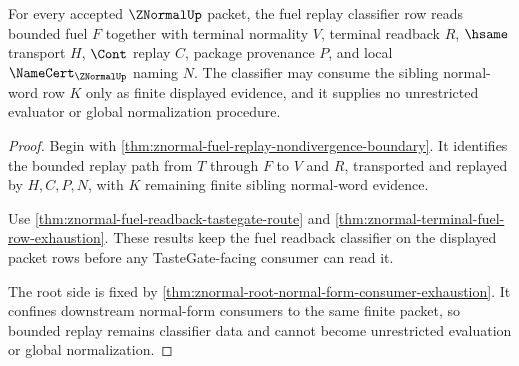 \begin{theorem}
\label{thm:znormal-fuel-replay-classifier-row}
For every accepted $\ZNormalUp$ packet, the fuel replay classifier row reads bounded fuel $F$ together with terminal normality $V$, terminal readback $R$, $\hsame$ transport $H$, $\Cont$ replay $C$, package provenance $P$, and local $\NameCert_{\ZNormalUp}$ naming $N$. The classifier may consume the sibling normal-word row $K$ only as finite displayed evidence, and it supplies no unrestricted evaluator or global normalization procedure.
\end{theorem}
\begin{proof}
Begin with \autoref{thm:znormal-fuel-replay-nondivergence-boundary}. It identifies the bounded replay path from $T$ through $F$ to $V$ and $R$, transported and replayed by $H,C,P,N$, with $K$ remaining finite sibling normal-word evidence.

Use \autoref{thm:znormal-fuel-readback-tastegate-route} and \autoref{thm:znormal-terminal-fuel-row-exhaustion}. These results keep the fuel readback classifier on the displayed packet rows before any TasteGate-facing consumer can read it.

The root side is fixed by \autoref{thm:znormal-root-normal-form-consumer-exhaustion}. It confines downstream normal-form consumers to the same finite packet, so bounded replay remains classifier data and cannot become unrestricted evaluation or global normalization.
\end{proof}

